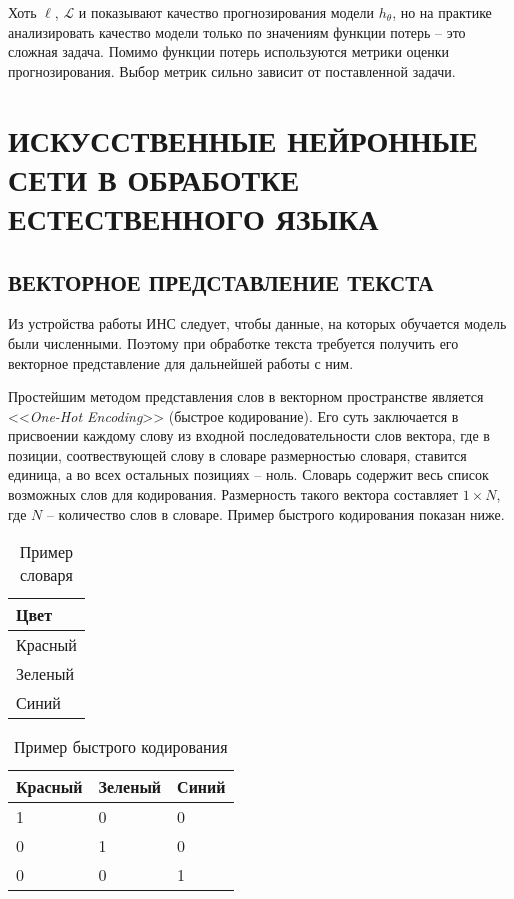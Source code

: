 Хоть $\ell$, $\mathcal{L}$ и показывают качество прогнозирования модели $h_{\theta}$, но на практике анализировать качество модели только по значениям функции потерь -- это сложная задача. Помимо функции потерь используются метрики оценки прогнозирования. Выбор метрик сильно зависит от поставленной задачи.

\section{ИСКУССТВЕННЫЕ НЕЙРОННЫЕ СЕТИ В ОБРАБОТКЕ ЕСТЕСТВЕННОГО ЯЗЫКА}
\subsection{ВЕКТОРНОЕ ПРЕДСТАВЛЕНИЕ ТЕКСТА}
Из устройства работы ИНС следует, чтобы данные, на которых обучается модель были численными. Поэтому при обработке текста требуется получить его векторное представление для дальнейшей работы с ним.

Простейшим методом представления слов в векторном пространстве является <<\textit{One-Hot Encoding}>> (быстрое кодирование). Его суть заключается в присвоении каждому слову из входной последовательности слов вектора, где в позиции, соотвествующей слову в словаре размерностью словаря, ставится единица, а во всех остальных позициях -- ноль. Словарь содержит весь список возможных слов для кодирования. Размерность такого вектора составляет $1 \times N$, где $N$ -- количество слов в словаре. Пример быстрого кодирования показан ниже.

\begin{table}[H]
    \captionsetup{format=hang, singlelinecheck=false}
    \raggedleft
    \caption{Пример словаря}
    \label{tab:dict}
    \centering
    \begin{tabular}{|p{5cm}|}
        \hline
        \textbf{Цвет} \\
        \hline
        Красный       \\
        \hline
        Зеленый       \\
        \hline
        Синий         \\
        \hline
    \end{tabular}
\end{table}

\begin{table}[H]
    \captionsetup{format=hang, singlelinecheck=false}
    \raggedleft
    \caption{Пример быстрого кодирования}
    \label{tab:ohe}
    \centering
    \begin{tabular}{|p{5cm}|p{5cm}|p{5cm}|}
        \hline
        \textbf{Красный} & \textbf{Зеленый} & \textbf{Синий} \\
        \hline
        1                & 0                & 0              \\
        \hline
        0                & 1                & 0              \\
        \hline
        0                & 0                & 1              \\
        \hline
    \end{tabular}
\end{table}

